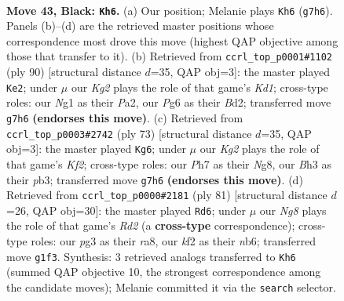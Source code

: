 \documentclass[11pt]{article}
\begin{document}
\clearpage

\begin{figure}[p]\centering
\begin{subfigure}{0.46\textwidth}\centering
\resizebox{\linewidth}{!}{%
\newchessgame
\chessboard[
  setfen={R7/5pkp/3r2p1/8/1p2P3/6Pb/5K1P/6nr b - - 3 43},
  showmover=false,
  pgfstyle=straightmove, color=movearrow, markmove={g7-h6}
]}
\caption{}
\end{subfigure}\hfill
\begin{subfigure}{0.46\textwidth}\centering
\resizebox{\linewidth}{!}{%
\newchessgame
\chessboard[
  setfen={8/b4k2/5p1p/1R1p4/5P2/1P6/P1PB4/3K3r w - - 3 46},
  showmover=false,
  pgfstyle=straightmove, color=movearrow, markmove={d1-e2}
]}
\caption{}
\end{subfigure}
\\[4pt]
\begin{subfigure}{0.46\textwidth}\centering
\resizebox{\linewidth}{!}{%
\newchessgame
\chessboard[
  setfen={6n1/3R1kp1/p4p2/1p5r/7P/1PB2P2/P4K2/8 b - - 1 37},
  showmover=false,
  pgfstyle=straightmove, color=movearrow, markmove={f7-g6}
]}
\caption{}
\end{subfigure}\hfill
\begin{subfigure}{0.46\textwidth}\centering
\resizebox{\linewidth}{!}{%
\newchessgame
\chessboard[
  setfen={R7/3r1pk1/1N4p1/2p5/7p/2Pn1P2/3K2PP/8 b - - 6 41},
  showmover=false,
  pgfstyle=straightmove, color=movearrow, markmove={d7-d6}
]}
\caption{}
\end{subfigure}
\caption{\textbf{Move 43, Black: \texttt{Kh6}.} (a) Our position; Melanie plays \texttt{Kh6} (\texttt{g7h6}). Panels (b)--(d) are the retrieved master positions whose correspondence most drove this move (highest QAP objective among those that transfer to it). (b) Retrieved from \texttt{ccrl\_top\_p0001\#1102} (ply 90) [structural distance $d$=35, QAP obj=3]: the master played \texttt{Ke2}; under $\mu$ our \emph{Kg2} plays the role of that game's \emph{Kd1}; cross-type roles: our \emph{N}g1 as their \emph{P}a2, our \emph{P}g6 as their \emph{B}d2; transferred move \texttt{g7h6} \textbf{(endorses this move)}. (c) Retrieved from \texttt{ccrl\_top\_p0003\#2742} (ply 73) [structural distance $d$=35, QAP obj=3]: the master played \texttt{Kg6}; under $\mu$ our \emph{Kg2} plays the role of that game's \emph{Kf2}; cross-type roles: our \emph{P}h7 as their \emph{N}g8, our \emph{B}h3 as their \emph{p}b3; transferred move \texttt{g7h6} \textbf{(endorses this move)}. (d) Retrieved from \texttt{ccrl\_top\_p0000\#2181} (ply 81) [structural distance $d$=26, QAP obj=30]: the master played \texttt{Rd6}; under $\mu$ our \emph{Ng8} plays the role of that game's \emph{Rd2} (a \textbf{cross-type} correspondence); cross-type roles: our \emph{p}g3 as their \emph{r}a8, our \emph{k}f2 as their \emph{n}b6; transferred move \texttt{g1f3}. Synthesis: 3 retrieved analogs transferred to \texttt{Kh6} (summed QAP objective 10, the strongest correspondence among the candidate moves); Melanie committed it via the \texttt{search} selector.}
\label{fig:thought-m85}
\end{figure}
\end{document}
